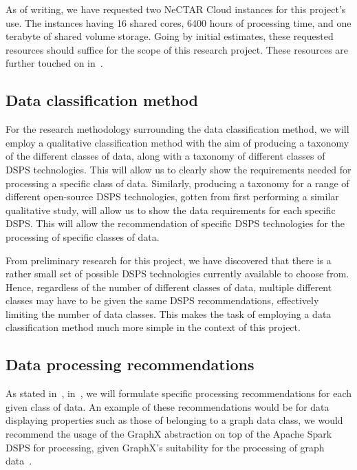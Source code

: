 \documentclass[a4paper,11pt]{article}
\begin{document}
As of writing, we have requested two NeCTAR Cloud instances for this project's use. The instances having 16 shared
cores, 6400 hours of processing time, and one terabyte of shared volume storage. Going by initial estimates, these
requested resources should suffice for the scope of this research project. These resources are further touched on
in~.


\subsection{Data classification method} %
\label{sub:data_classification_method}

For the research methodology surrounding the data classification method, we will employ a qualitative classification
method with the aim of producing a taxonomy of the different classes of data, along with a taxonomy of different classes
of DSPS technologies. This will allow us to clearly show the requirements needed for processing a specific class of
data. Similarly, producing a taxonomy for a range of different open-source DSPS technologies, gotten from first
performing a similar qualitative study, will allow us to show the data requirements for each specific DSPS. This will allow
the recommendation of specific DSPS technologies for the processing of specific classes of data.

From preliminary research for this project, we have discovered that there is a rather small set of possible DSPS
technologies currently available to choose from. Hence, regardless of the number of different classes of data, multiple
different classes may have to be given the same DSPS recommendations, effectively limiting the number of data
classes. This makes the task of employing a data classification method much more simple in the context of this project.


\subsection{Data processing recommendations} %
\label{sub:data_processing_recommendations}

As stated in~, in~, we will formulate specific processing
recommendations for each given class of data. An example of these recommendations would be for data displaying
properties such as those of belonging to a graph data class, we would recommend the usage of the GraphX abstraction on top of
the Apache Spark DSPS for processing, given GraphX's suitability for the processing of graph
data~\cite{DBLP:journals/corr/XinCDGFS14}.
\end{document}
